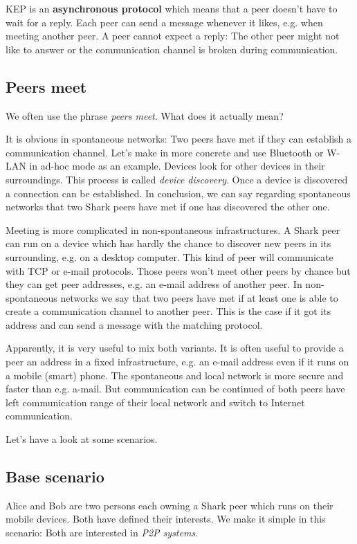 KEP is an {\bf asynchronous protocol} which means that a peer doesn't have to wait for a reply. Each peer can send a message whenever it likes, e.g. when meeting another peer. A peer cannot expect a reply: The other peer might not like to answer or the communication channel is broken during communication.

\subsection{Peers meet}
We often use the phrase {\it peers meet}. What does it actually mean?

It is obvious in spontaneous networks: Two peers have met if they can establish a communication channel. Let's make in more concrete and use Bluetooth or W-LAN in ad-hoc mode as an example. Devices look for other devices in their surroundings.
This process is called {\it device discovery}. Once a device is discovered a connection can be established. In conclusion, we can say regarding spontaneous networks that two Shark peers have met if one has discovered the other one.

Meeting is more complicated in non-spontaneous infrastructures. A Shark peer can run on a device which has hardly the chance to discover new peers in its surrounding, e.g. on a desktop computer. This kind of peer will communicate with TCP or e-mail protocols. Those peers won't meet other peers by chance but they can get peer addresses, e.g. an e-mail address of another peer. In non-spontaneous networks we say that two peers have met if at least one is able to create a communication channel to another peer. This is the case if it got its address and can send a message with the matching protocol.

Apparently, it is very useful to mix both variants. It is often useful to provide a peer an address in a fixed infrastructure, e.g. an e-mail address even if it runs on a mobile (smart) phone. The spontaneous and local network is more secure and faster than e.g. a-mail. But communication can be continued of both peers have left communication range of their local network and switch to Internet communication.

Let's have a look at some scenarios.

\subsection{Base scenario}
\label{sec:concepts:baseScenario}
Alice and Bob are two persons each owning a Shark peer which runs on their mobile devices. Both have defined their interests. We make it simple in this scenario:
Both are interested in {\it P2P systems}. 

